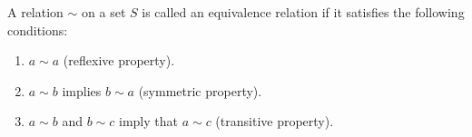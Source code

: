 A relation $\sim$ on a set $S$ is called an equivalence relation if it satisfies the following conditions:
\begin{enumerate}
\item $a \sim a$ (reflexive property).
\item $a \sim b$ implies $b \sim a$ (symmetric property).
\item $a \sim b$ and $b \sim c$ imply that $a \sim c$ (transitive property).
\end{enumerate}
